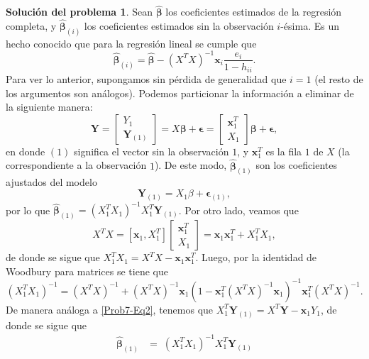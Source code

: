\documentclass[twoside,12pt]{article}
\theoremstyle{definition}
\newtheorem{soln}{Solución del problema}
\begin{document}
\newpage
\begin{soln}
Sean $\hat{\boldsymbol{\beta}}$ los coeficientes estimados de la regresión completa, y $\hat{\boldsymbol{\beta}}_{(i)}$ los coeficientes estimados sin la observación $i$-ésima. Es un hecho conocido que para la regresión lineal se cumple que
\begin{equation}\label{Prob7-Eq1}
  \hat{\boldsymbol{\beta}}_{(i)} = \hat{\boldsymbol{\beta}} - {(X^{T} X)}^{-1}\boldsymbol{x}_i \frac{e_i}{1-h_{ii}}.
\end{equation}
Para ver lo anterior, supongamos sin pérdida de generalidad que $i=1$ (el resto de los argumentos son análogos). Podemos particionar la información a eliminar de la siguiente manera:
\[
\boldsymbol{Y}=\left[ \begin{array}{c}
Y_1 \\ \boldsymbol{Y}_{(1)} \end{array} \right] =
X \boldsymbol{\beta} + \boldsymbol{\epsilon} = \left[ \begin{array}{c}
\boldsymbol{x}_1^{T} \\ X_1 \end{array} \right] \boldsymbol{\beta} + \boldsymbol{\epsilon},
\]
en donde $(1)$ significa el vector sin la observación $1$, y $\boldsymbol{x}_1^{T}$ es la fila $1$ de $X$ (la correspondiente a la observación $1$). De este modo, $\hat{\boldsymbol{\beta}}_{(1)}$ son los coeficientes ajustados del modelo
\[
\boldsymbol{Y}_{(1)}=X_1\beta+\boldsymbol{\epsilon}_{(1)},
\]
por lo que $\hat{\boldsymbol{\beta}}_{(1)}=(X_1^{T}X_1)^{-1}X_1^{T}\boldsymbol{Y}_{(1)}$. Por otro lado, veamos que
\begin{equation}\label{Prob7-Eq2}
  X^{T}X=[\boldsymbol{x}_1,X_1^{T}]\left[ \begin{array}{c} \boldsymbol{x}_1^{T} \\ X_1 \end{array} \right]
= \boldsymbol{x}_1\boldsymbol{x}_1^{T}+X_1^{T}X_1,
\end{equation}
de donde se sigue que $X_1^{T}X_1=X^{T}X-\boldsymbol{x}_1\boldsymbol{x}_1^{T}$. Luego, por la identidad de Woodbury para matrices se tiene que
\[
(X_1^{T}X_1)^{-1} =
(X^{T}X)^{-1}+(X^{T}X)^{-1}\boldsymbol{x}_1(1-\boldsymbol{x}_1^{T}(X^{T}X)^{-1}\boldsymbol{x}_1)^{-1}\boldsymbol{x}_1^{T}(X^{T}X)^{-1}.
\]
De manera análoga a \eqref{Prob7-Eq2}, tenemos que $X_1^{T}\boldsymbol{Y}_{(1)} = X^{T}\boldsymbol{Y} - \boldsymbol{x}_1Y_1$, de donde se sigue que
\[
\begin{split}
\hat{\boldsymbol{\beta}}_{(1)} & = \;(X_1^{T}X_1)^{-1}X_1^{T}\boldsymbol{Y}_{(1)}\\[5pt]

\end{split}\]
\end{soln}
\end{document}
